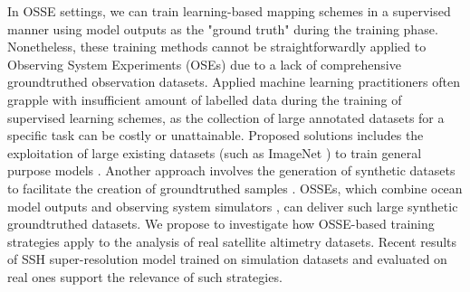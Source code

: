 \begin{bibunit}
In OSSE settings, we can train learning-based mapping schemes in a supervised manner using 
model outputs as the "ground truth" during the training phase.
Nonetheless, these training methods cannot be straightforwardly applied to Observing System Experiments (OSEs) due to a lack of comprehensive groundtruthed observation datasets.
Applied machine learning practitioners often grapple with insufficient amount of labelled data during the training of supervised learning schemes, as the collection of large annotated datasets for a specific task can be costly or unattainable.
Proposed solutions includes the exploitation of large existing datasets (such as ImageNet \cite{dengImageNetLargescaleHierarchical2009}) to train general purpose models \cite{heDeepResidualLearning2016}. Another approach involves the generation of synthetic datasets to facilitate the creation of groundtruthed samples \cite{gomezgonzalezVIPVortexImage2017,dosovitskiyFlowNetLearningOptical2015}. OSSEs, which combine ocean model outputs and observing system simulators \cite{boukabaraCommunityGlobalObserving2018}, can deliver such large synthetic groundtruthed datasets. We propose to investigate how OSSE-based training strategies apply to the analysis of real satellite altimetry datasets. Recent results of SSH super-resolution model trained on simulation datasets and evaluated on real ones \cite{buongiornonardelliSuperResolvingOceanDynamics2022} support the relevance of such strategies.





\end{bibunit}

